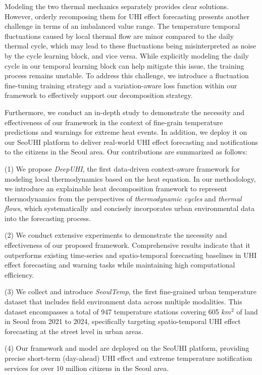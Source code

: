Modeling the two thermal mechanics separately provides clear solutions. However, orderly recomposing them for UHI effect forecasting presents another challenge in terms of an imbalanced value range. The temperature temporal fluctuations caused by local thermal flow are minor compared to the daily thermal cycle, which may lead to these fluctuations being misinterpreted as noise by the cycle learning block, and vice versa. While explicitly modeling the daily cycle in our temporal learning block can help mitigate this issue, the training process remains unstable. To address this challenge, we introduce a fluctuation fine-tuning training strategy and a variation-aware loss function within our framework to effectively support our decomposition strategy.

Furthermore, we conduct an in-depth study to demonstrate the necessity and effectiveness of our framework in the context of fine-grain temperature predictions and warnings for extreme heat events. In addition, we deploy it on our SeoUHI platform to deliver real-world UHI effect forecasting and notifications to the citizens in the Seoul area. Our contributions are summarized as follows:




(1) We propose \textit{DeepUHI}, the first data-driven context-aware framework for modeling local thermodynamics based on the heat equation. In our methodology, we introduce an explainable heat decomposition framework to represent thermodynamics from the perspectives of \textit{thermodynamic cycles} and \textit{thermal flows}, which systematically and concisely incorporates urban environmental data into the forecasting process.

(2) We conduct extensive experiments to demonstrate the necessity and effectiveness of our proposed framework. Comprehensive results indicate that it outperforms existing time-series and spatio-temporal forecasting baselines in UHI effect forecasting and warning tasks while maintaining high computational efficiency.

(3) We collect and introduce \textit{SeoulTemp}, the first fine-grained urban temperature dataset that includes field environment data across multiple modalities. This dataset encompasses a total of 947 temperature stations covering 605 $km^{2}$ of land in Seoul from 2021 to 2024, specifically targeting spatio-temporal UHI effect forecasting at the street level in urban areas.

(4) Our framework and model are deployed on the SeoUHI platform, providing precise short-term (day-ahead) UHI effect and extreme temperature notification services for over 10 million citizens in the Seoul area.




